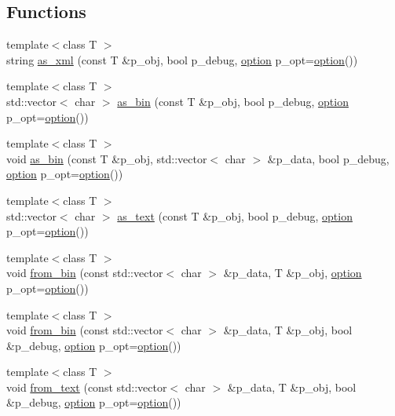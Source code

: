 \subsection*{Functions}
\begin{DoxyCompactItemize}
\item 
{\footnotesize template$<$class T $>$ }\\string \hyperlink{namespacextd_1_1serializer_aff0b24f230c8b5083104eccb94242a8c}{as\-\_\-xml} (const T \&p\-\_\-obj, bool p\-\_\-debug, \hyperlink{structxtd_1_1serializer_1_1option}{option} p\-\_\-opt=\hyperlink{structxtd_1_1serializer_1_1option}{option}())
\item 
{\footnotesize template$<$class T $>$ }\\std\-::vector$<$ char $>$ \hyperlink{namespacextd_1_1serializer_a0088e6d509f6652e58c7c0eea9102884}{as\-\_\-bin} (const T \&p\-\_\-obj, bool p\-\_\-debug, \hyperlink{structxtd_1_1serializer_1_1option}{option} p\-\_\-opt=\hyperlink{structxtd_1_1serializer_1_1option}{option}())
\item 
{\footnotesize template$<$class T $>$ }\\void \hyperlink{namespacextd_1_1serializer_a1c43eba643505bba5858d6d5431201fb}{as\-\_\-bin} (const T \&p\-\_\-obj, std\-::vector$<$ char $>$ \&p\-\_\-data, bool p\-\_\-debug, \hyperlink{structxtd_1_1serializer_1_1option}{option} p\-\_\-opt=\hyperlink{structxtd_1_1serializer_1_1option}{option}())
\item 
{\footnotesize template$<$class T $>$ }\\std\-::vector$<$ char $>$ \hyperlink{namespacextd_1_1serializer_a5ac463bb961b98f1b8b7c2655d2772db}{as\-\_\-text} (const T \&p\-\_\-obj, bool p\-\_\-debug, \hyperlink{structxtd_1_1serializer_1_1option}{option} p\-\_\-opt=\hyperlink{structxtd_1_1serializer_1_1option}{option}())
\item 
{\footnotesize template$<$class T $>$ }\\void \hyperlink{namespacextd_1_1serializer_a601beccda10ec2760c371d39045bec0e}{from\-\_\-bin} (const std\-::vector$<$ char $>$ \&p\-\_\-data, T \&p\-\_\-obj, \hyperlink{structxtd_1_1serializer_1_1option}{option} p\-\_\-opt=\hyperlink{structxtd_1_1serializer_1_1option}{option}())
\item 
{\footnotesize template$<$class T $>$ }\\void \hyperlink{namespacextd_1_1serializer_a76ec6ed068121fc7ff0f6514132c5683}{from\-\_\-bin} (const std\-::vector$<$ char $>$ \&p\-\_\-data, T \&p\-\_\-obj, bool \&p\-\_\-debug, \hyperlink{structxtd_1_1serializer_1_1option}{option} p\-\_\-opt=\hyperlink{structxtd_1_1serializer_1_1option}{option}())
\item 
{\footnotesize template$<$class T $>$ }\\void \hyperlink{namespacextd_1_1serializer_a27ea640a20bff130274562ddd8762c0a}{from\-\_\-text} (const std\-::vector$<$ char $>$ \&p\-\_\-data, T \&p\-\_\-obj, bool \&p\-\_\-debug, \hyperlink{structxtd_1_1serializer_1_1option}{option} p\-\_\-opt=\hyperlink{structxtd_1_1serializer_1_1option}{option}())
\end{DoxyCompactItemize}


